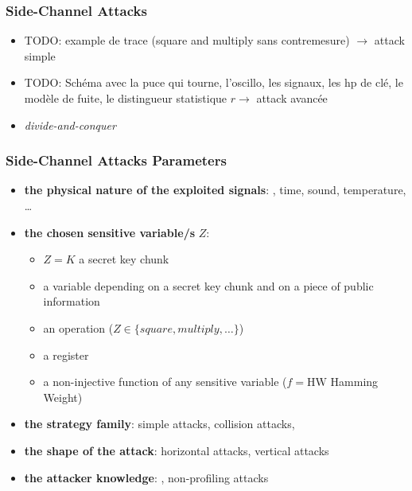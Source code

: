 \begin{frame}
\frametitle{Side-Channel Attacks}
\begin{itemize}
\item TODO: example de trace (square and multiply sans contremesure) $\rightarrow$ attack simple
\item TODO: Schéma avec la puce qui tourne, l'oscillo, les signaux, les hp de clé, le modèle de fuite, le distingueur statistique $r\rightarrow$ attack avancée
\item \emph{divide-and-conquer}

\end{itemize}
\end{frame}

\begin{frame}
\frametitle{Side-Channel Attacks Parameters}
\begin{itemize}
\item \textbf{the physical nature of the exploited signals}: , time, sound, temperature, \dots
\item \textbf{the chosen sensitive variable/s} $Z$:
\begin{itemize}
\item $Z = K$ a secret key chunk
\item {} a variable depending on a secret key chunk and on a piece of public information
\item an operation (\eg $Z \in \{ square, multiply, \dots\}$)
\item a register 
\item {} a non-injective function of any sensitive variable (\eg $f = \mathrm{HW}$ Hamming Weight)
\end{itemize}
\item \textbf{the strategy family}: simple attacks, collision attacks, 
\item \textbf{the shape of the attack}: horizontal attacks, vertical attacks
\item \textbf{the attacker knowledge}: , non-profiling attacks
\end{itemize}
\end{frame}


